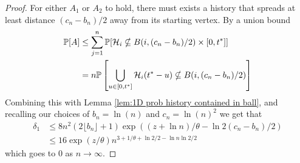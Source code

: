 \begin{proof}
		For either $A_1$ or $A_2$ to hold, there must exists a history that spreads at least distance $(c_n - b_n) / 2$ away from its starting vertex. 
		By a union bound
		\begin{align}
			\mathbb{P}[A] &\leq \sum_{j = 1}^n \mathbb{P}[\mathcal{H}_i \nsubseteq B(i, (c_n - b_n)/2) \times [0, t^*]]\\
				&= n \mathbb{P}\left[\bigcup_{u \in [0, t^*]}\mathcal{H}_i(t^* - u) \nsubseteq B(i, (c_n - b_n)/2)\right]
		\end{align}
		Combining this with Lemma \ref{lem:1D prob history contained in ball}, and recalling our choices of $b_n = \ln(n)$ and $c_n = \ln(n)^2$ we get that
		\begin{align}
			\delta_1 &\leq 8n^2(2\lfloor b_n\rfloor + 1) \exp\left((z + \ln n)/\theta - \ln 2(c_n - b_n) /2 \right)\\
			&\leq 16 \exp(z/\theta) n^{3+ 1/\theta + \ln2/2 -\ln n \ln 2/ 2}
		\end{align}
		which goes to $0$ as $n \rightarrow \infty$.
	\end{proof}

